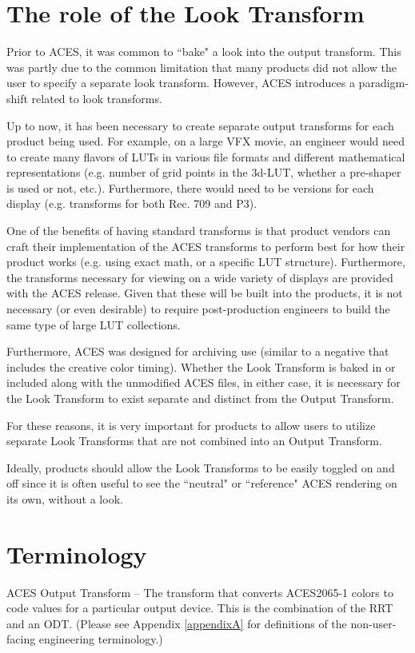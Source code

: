 \section{The role of the Look Transform}
Prior to ACES, it was common to ``bake" a look into the output transform. This was partly due to the common limitation that many products did not allow the user to specify a separate look transform. However, ACES introduces a paradigm-shift related to look transforms.

Up to now, it has been necessary to create separate output transforms for each product being used. For example, on a large VFX movie, an engineer would need to create many flavors of LUTs in various file formats and different mathematical representations (e.g. number of grid points in the 3d-LUT, whether a pre-shaper is used or not, etc.). Furthermore, there would need to be versions for each display (e.g. transforms for both Rec. 709 and P3).

One of the benefits of having standard transforms is that product vendors can craft their implementation of the ACES transforms to perform best for how their product works (e.g. using exact math, or a specific LUT structure). Furthermore, the transforms necessary for viewing on a wide variety of displays are provided with the ACES release. Given that these will be built into the products, it is not necessary (or even desirable) to require post-production engineers to build the same type of large LUT collections.

Furthermore, ACES was designed for archiving use (similar to a negative that includes the creative color timing). Whether the Look Transform is baked in or included along with the unmodified ACES files, in either case, it is necessary for the Look Transform to exist separate and distinct from the Output Transform.

For these reasons, it is very important for products to allow users to utilize separate Look Transforms that are not combined into an Output Transform.

Ideally, products should allow the Look Transforms to be easily toggled on and off since it is often useful to see the ``neutral" or ``reference" ACES rendering on its own, without a look.

\section{Terminology} \label{sec:terminology}
ACES Output Transform -- The transform that converts ACES2065-1 colors to code values for a particular output device. This is the combination of the RRT and an ODT. (Please see Appendix \ref{appendixA} for definitions of the non-user-facing engineering terminology.)

